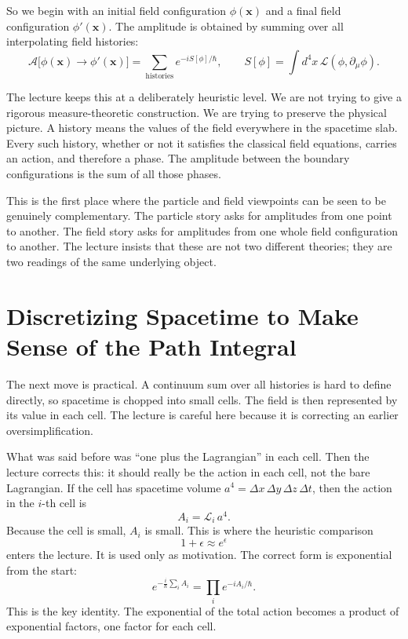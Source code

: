 So we begin with an initial field configuration \(\phi(\mathbf{x})\) and a final field configuration \(\phi'(\mathbf{x})\). The amplitude is obtained by summing over all interpolating field histories:
\begin{equation}
\mathcal{A}\big[\phi(\mathbf{x})\to \phi'(\mathbf{x})\big]
=\sum_{\text{histories}} e^{-iS[\phi]/\hbar},
\qquad
S[\phi]=\int d^4x\,\mathcal{L}(\phi,\partial_\mu\phi).
\end{equation}

The lecture keeps this at a deliberately heuristic level. We are not trying to give a rigorous measure-theoretic construction. We are trying to preserve the physical picture. A history means the values of the field everywhere in the spacetime slab. Every such history, whether or not it satisfies the classical field equations, carries an action, and therefore a phase. The amplitude between the boundary configurations is the sum of all those phases.

This is the first place where the particle and field viewpoints can be seen to be genuinely complementary. The particle story asks for amplitudes from one point to another. The field story asks for amplitudes from one whole field configuration to another. The lecture insists that these are not two different theories; they are two readings of the same underlying object.

\section{Discretizing Spacetime to Make Sense of the Path Integral}

The next move is practical. A continuum sum over all histories is hard to define directly, so spacetime is chopped into small cells. The field is then represented by its value in each cell. The lecture is careful here because it is correcting an earlier oversimplification.

What was said before was ``one plus the Lagrangian'' in each cell. Then the lecture corrects this: it should really be the action in each cell, not the bare Lagrangian. If the cell has spacetime volume \(a^4=\Delta x\,\Delta y\,\Delta z\,\Delta t\), then the action in the \(i\)-th cell is
\begin{equation}
A_i=\mathcal{L}_i\,a^4.
\end{equation}
Because the cell is small, \(A_i\) is small. This is where the heuristic comparison
\begin{equation}
1+\epsilon \approx e^\epsilon
\end{equation}
enters the lecture. It is used only as motivation. The correct form is exponential from the start:
\begin{equation}
e^{-\frac{i}{\hbar}\sum_i A_i}
=
\prod_i e^{-iA_i/\hbar}.
\end{equation}
This is the key identity. The exponential of the total action becomes a product of exponential factors, one factor for each cell.

